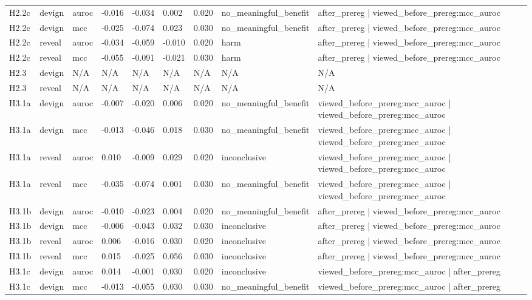 \begin{tabular}{lllllllll}
H2.2c & devign & auroc & -0.016 & -0.034 & 0.002 & 0.020 & no\_meaningful\_benefit & after\_prereg | viewed\_before\_prereg:mcc\_auroc \\
H2.2c & devign & mcc & -0.025 & -0.074 & 0.023 & 0.030 & no\_meaningful\_benefit & after\_prereg | viewed\_before\_prereg:mcc\_auroc \\
H2.2c & reveal & auroc & -0.034 & -0.059 & -0.010 & 0.020 & harm & after\_prereg | viewed\_before\_prereg:mcc\_auroc \\
H2.2c & reveal & mcc & -0.055 & -0.091 & -0.021 & 0.030 & harm & after\_prereg | viewed\_before\_prereg:mcc\_auroc \\
H2.3 & devign & N/A & N/A & N/A & N/A & N/A & N/A & N/A \\
H2.3 & reveal & N/A & N/A & N/A & N/A & N/A & N/A & N/A \\
H3.1a & devign & auroc & -0.007 & -0.020 & 0.006 & 0.020 & no\_meaningful\_benefit & viewed\_before\_prereg:mcc\_auroc | viewed\_before\_prereg:mcc\_auroc \\
H3.1a & devign & mcc & -0.013 & -0.046 & 0.018 & 0.030 & no\_meaningful\_benefit & viewed\_before\_prereg:mcc\_auroc | viewed\_before\_prereg:mcc\_auroc \\
H3.1a & reveal & auroc & 0.010 & -0.009 & 0.029 & 0.020 & inconclusive & viewed\_before\_prereg:mcc\_auroc | viewed\_before\_prereg:mcc\_auroc \\
H3.1a & reveal & mcc & -0.035 & -0.074 & 0.001 & 0.030 & no\_meaningful\_benefit & viewed\_before\_prereg:mcc\_auroc | viewed\_before\_prereg:mcc\_auroc \\
H3.1b & devign & auroc & -0.010 & -0.023 & 0.004 & 0.020 & no\_meaningful\_benefit & after\_prereg | viewed\_before\_prereg:mcc\_auroc \\
H3.1b & devign & mcc & -0.006 & -0.043 & 0.032 & 0.030 & inconclusive & after\_prereg | viewed\_before\_prereg:mcc\_auroc \\
H3.1b & reveal & auroc & 0.006 & -0.016 & 0.030 & 0.020 & inconclusive & after\_prereg | viewed\_before\_prereg:mcc\_auroc \\
H3.1b & reveal & mcc & 0.015 & -0.025 & 0.056 & 0.030 & inconclusive & after\_prereg | viewed\_before\_prereg:mcc\_auroc \\
H3.1c & devign & auroc & 0.014 & -0.001 & 0.030 & 0.020 & inconclusive & viewed\_before\_prereg:mcc\_auroc | after\_prereg \\
H3.1c & devign & mcc & -0.013 & -0.055 & 0.030 & 0.030 & no\_meaningful\_benefit & viewed\_before\_prereg:mcc\_auroc | after\_prereg \\

\end{tabular}

